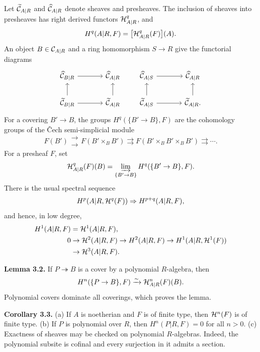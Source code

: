 \documentclass[11pt]{article}
\begin{document}
Let \(\widetilde{\mathcal C}_{A|R}\) and \(\widehat{\mathcal C}_{A|R}\) denote sheaves and presheaves.  The inclusion of sheaves into presheaves has right derived functors \(\mathcal H^q_{A|R}\), and
\[
 H^q(A|R,F)=\bigl[\mathcal H^q_{A|R}(F)\bigr](A).
\]
An object \(B\in\mathcal C_{A|R}\) and a ring homomorphism \(S\to R\) give the functorial diagrams
\[
\begin{tikzcd}[column sep=large]
\widehat{\cC}_{B|R} \arrow[r] & \widehat{\cC}_{A|R} \\
\widetilde{\cC}_{B|R} \arrow[u] \arrow[r] & \widetilde{\cC}_{A|R} \arrow[u]
\end{tikzcd}
\qquad
\begin{tikzcd}[column sep=large]
\widehat{\cC}_{A|S} \arrow[r] & \widehat{\cC}_{A|R} \\
\widetilde{\cC}_{A|S} \arrow[u] \arrow[r] & \widetilde{\cC}_{A|R} \arrow[u].
\end{tikzcd}
\]
For a covering \(B'\to B\), the groups \(H^q(\{B'\to B\},F)\) are the cohomology groups of the Čech semi-simplicial module
\[
F(B')\mathrel{\substack{\longrightarrow\\[-.6ex]\longrightarrow}} F(B'\times_BB')\rightrightarrows F(B'\times_BB'\times_BB')\rightrightarrows\cdots .
\]
For a presheaf \(F\), set
\[
\mathcal H^q_{A|R}(F)(B)=\varinjlim_{\{B'\to B\}}H^q(\{B'\to B\},F).
\]
There is the usual spectral sequence
\[
H^p(A|R,\mathcal H^q(F))\Rightarrow H^{p+q}(A|R,F),
\]
and hence, in low degree,
\[
\begin{aligned}
H^1(A|R,F)&=\mathcal H^1(A|R,F),\\
0&\to\mathcal H^2(A|R,F)\to H^2(A|R,F)\to H^1(A|R,\mathcal H^1(F))\\
 &\to\mathcal H^3(A|R,F).
\end{aligned}
\]

\textbf{Lemma 3.2.}  If \(P\twoheadrightarrow B\) is a cover by a polynomial \(R\)-algebra, then
\[
H^n(\{P\to B\},F)\xrightarrow{\sim}\mathcal H^n_{A|R}(F)(B).
\]
Polynomial covers dominate all coverings, which proves the lemma.

\textbf{Corollary 3.3.}  (a) If \(A\) is noetherian and \(F\) is of finite type, then \(\mathcal H^n(F)\) is of finite type.  (b) If \(P\) is polynomial over \(R\), then \(H^n(P|R,F)=0\) for all \(n>0\).  (c) Exactness of sheaves may be checked on polynomial \(R\)-algebras.  Indeed, the polynomial subsite is cofinal and every surjection in it admits a section.
\end{document}
